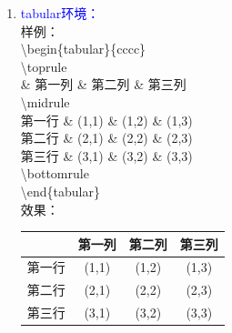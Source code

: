 \documentclass[12pt,a4paper,UTF8]{article}
\begin{document}
\begin{enumerate}
        \item \textcolor{blue}{tabular环境：}\\
        样例：\\
        \textbackslash begin\{tabular\}\{cccc\}\\
            \textbackslash toprule\\
                  \& 第一列 \& 第二列 \& 第三列 \\
            \textbackslash midrule\\
            第一行 \& (1,1) \& (1,2) \& (1,3) \\
            第二行 \& (2,1) \& (2,2) \& (2,3) \\
            第三行 \& (3,1) \& (3,2) \& (3,3) \\
            \textbackslash bottomrule\\
        \textbackslash end\{tabular\}\\
        效果：\\[8pt]
        \begin{tabular}{cccc}
            \toprule
                  & 第一列 & 第二列 & 第三列 \\
            \midrule
            第一行 & (1,1) & (1,2) & (1,3) \\
            第二行 & (2,1) & (2,2) & (2,3) \\
            第三行 & (3,1) & (3,2) & (3,3) \\
            \bottomrule
        \end{tabular}
        \bigskip
        

\end{enumerate}
\end{document}
